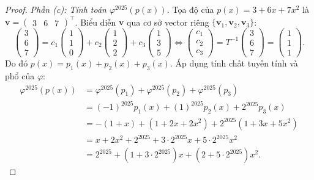 \documentclass{article}
\begin{document}
\begin{proof}
\emph{Phần (c): Tính toán $\varphi^{2025}(p(x))$.}
Tọa độ của $p(x) = 3 + 6x + 7x^2$ là $\mathbf{v} = \begin{pmatrix} 3 & 6 & 7 \end{pmatrix}^\top$.
Biểu diễn $\mathbf{v}$ qua cơ sở vector riêng $\{\mathbf{v}_1, \mathbf{v}_2, \mathbf{v}_3\}$:
\begin{equation}
    \begin{pmatrix} 3 \\ 6 \\ 7 \end{pmatrix} = c_1 \begin{pmatrix} 1 \\ 1 \\ 0 \end{pmatrix} + c_2 \begin{pmatrix} 1 \\ 2 \\ 2 \end{pmatrix} + c_3 \begin{pmatrix} 1 \\ 3 \\ 5 \end{pmatrix} \iff \begin{pmatrix} c_1 \\ c_2 \\ c_3 \end{pmatrix} = T^{-1} \begin{pmatrix} 3 \\ 6 \\ 7 \end{pmatrix} = \begin{pmatrix} 1 \\ 1 \\ 1 \end{pmatrix}.
\end{equation}
Do đó $p(x) = p_1(x) + p_2(x) + p_3(x)$.
Áp dụng tính chất tuyến tính và phổ của $\varphi$:
\begin{align}
    \varphi^{2025}(p(x)) &= \varphi^{2025}(p_1) + \varphi^{2025}(p_2) + \varphi^{2025}(p_3) \nonumber \\
    &= (-1)^{2025} p_1(x) + (1)^{2025} p_2(x) + 2^{2025} p_3(x) \nonumber \\
    &= -(1 + x) + (1 + 2x + 2x^2) + 2^{2025}(1 + 3x + 5x^2) \nonumber \\
    &= x + 2x^2 + 2^{2025} + 3 \cdot 2^{2025} x + 5 \cdot 2^{2025} x^2 \nonumber \\
    &= 2^{2025} + (1 + 3 \cdot 2^{2025})x + (2 + 5 \cdot 2^{2025})x^2.
\end{align}
\end{proof}
\end{document}
